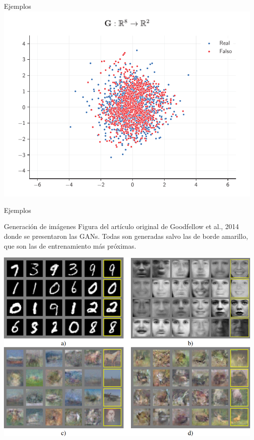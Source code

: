 \documentclass[aspectratio=169]{beamer}
\begin{document}

\begin{frame}{Ejemplos}
	\includegraphics[width=.67\textwidth, center]{imgs/tema4/gan/ex_2d_2.pdf}\\
\end{frame}



\begin{frame}{Ejemplos}
	\begin{block}{Generación de imágenes}
		Figura del artículo original de Goodfellow et al., 2014 donde se presentaron las GANs. Todas son generadas salvo las de borde amarillo, que son las de entrenamiento más próximas.
	\end{block}
	\vspace{.2cm}
	\includegraphics[width=.47\textwidth, center]{imgs/tema4/gan/gan-gallery.png}\\
\end{frame}
\end{document}
